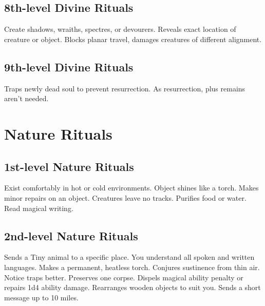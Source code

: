 \subsection{8th-level Divine Rituals}
\begin{rituallist}
     Create shadows, wraiths, spectres, or devourers.
     Reveals exact location of creature or object.
     Blocks planar travel, damages creatures of different alignment.
\end{rituallist}

\subsection{9th-level Divine Rituals}
\begin{rituallist}
    \F Traps newly dead soul to prevent resurrection.
     As resurrection, plus remains aren't needed.
\end{rituallist}

\section{Nature Rituals}

\subsection{1st-level Nature Rituals}
\begin{rituallist}
     Exist comfortably in hot or cold environments.
     Object shines like a torch.
     Makes minor repairs on an object.
     Creatures leave no tracks.
     Purifies food or water.
     Read magical writing.
\end{rituallist}

\subsection{2nd-level Nature Rituals}
\begin{rituallist}
     Sends a Tiny animal to a specific place.
     You understand all spoken and written languages.
     Makes a permanent, heatless torch.
     Conjures sustinence from thin air.
     Notice traps better.
     Preserves one corpse.
     Dispels magical ability penalty or repairs 1d4 ability damage.
     Rearranges wooden objects to suit you.
     Sends a short message up to 10 miles.
\end{rituallist}

